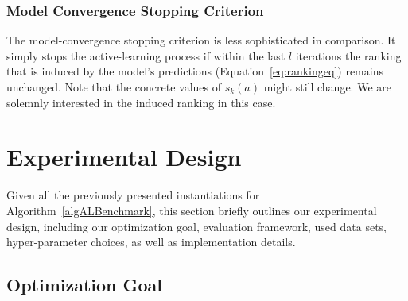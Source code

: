 \documentclass[runningheads]{llncs}
\begin{document}




\subsubsection{Model Convergence Stopping Criterion}

The model-convergence stopping criterion is less sophisticated in comparison.
It simply stops the active-learning process if within the last $l$ iterations the ranking that is induced by the model's predictions (Equation~\ref{eq:rankingeq}) remains unchanged.
Note that the concrete values of $s_k(a)$ might still change.
We are solemnly interested in the induced ranking in this case.


\section{Experimental Design}

Given all the previously presented instantiations for Algorithm~\ref{algALBenchmark}, this section briefly outlines our experimental design, including our optimization goal, evaluation framework, used data sets, hyper-parameter choices, as well as implementation details.

\subsection{Optimization Goal}
\label{sec:goal}
\end{document}
